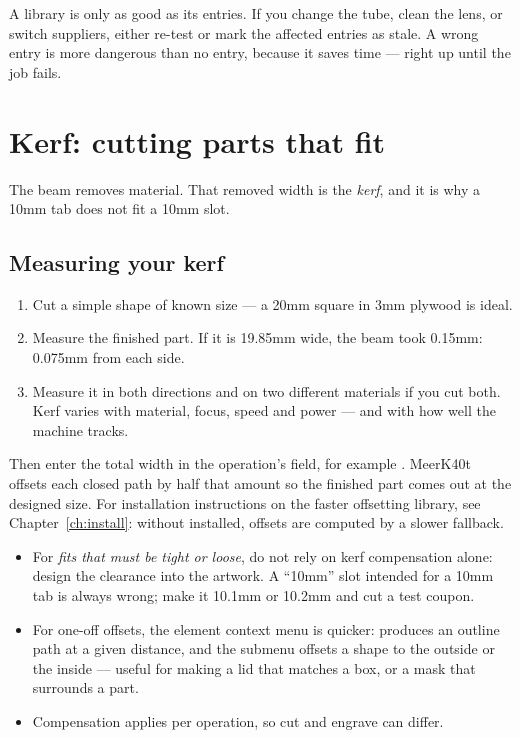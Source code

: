\begin{notebox}
A library is only as good as its entries. If you change the tube, clean the lens,
or switch suppliers, either re-test or mark the affected entries as stale. A
wrong entry is more dangerous than no entry, because it saves time --- right up
until the job fails.
\end{notebox}

\section{Kerf: cutting parts that fit}

The beam removes material. That removed width is the \emph{kerf}, and it is why a
10\unit{mm} tab does not fit a 10\unit{mm} slot.

\subsection*{Measuring your kerf}

\begin{enumerate}[label=\arabic*.,leftmargin=1.4em]
  \item Cut a simple shape of known size --- a 20\unit{mm} square in 3\unit{mm}
        plywood is ideal.
  \item Measure the finished part. If it is 19.85\unit{mm} wide, the beam took
        0.15\unit{mm}: 0.075\unit{mm} from each side.
  \item Measure it in both directions and on two different materials if you cut
        both. Kerf varies with material, focus, speed and power --- and with how
        well the machine tracks.
\end{enumerate}

\noindent Then enter the total width in the operation's
 field, for example \cmd{0.15mm}. MeerK40t offsets each
closed path by half that amount so the finished part comes out at the designed
size. For installation instructions on the faster offsetting library, see
Chapter~\ref{ch:install}: without  installed, offsets are computed
by a slower fallback.

\begin{itemize}
  \item For \emph{fits that must be tight or loose}, do not rely on kerf
        compensation alone: design the clearance into the artwork. A
        ``10\unit{mm}'' slot intended for a 10\unit{mm} tab is always wrong; make
        it 10.1\unit{mm} or 10.2\unit{mm} and cut a test coupon.
  \item For one-off offsets, the element context menu is quicker:
         produces an outline path at a given distance,
        and the  submenu offsets a shape to the outside or
        the inside --- useful for making a lid that matches a box, or a mask that
        surrounds a part.
  \item Compensation applies per operation, so cut and engrave can differ.
\end{itemize}

